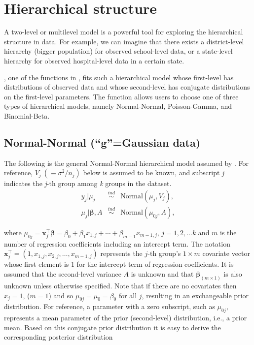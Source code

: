 \documentclass[article]{jss}
\begin{document}
\section[Hierarchical Structure]{Hierarchical structure} \label{sec2}
A two-level or multilevel model is a powerful tool for exploring the hierarchical structure in data. For example, we can imagine that there exists a district-level hierarchy (bigger population) for observed school-level data, or a state-level hierarchy for observed hospital-level data in a certain state. 

, one of the functions in , fits such a hierarchical model whose first-level has distributions of observed data and whose second-level has conjugate distributions on the first-level parameters. The  function allows users to choose one of three types of hierarchical models, namely Normal-Normal, Poisson-Gamma, and Binomial-Beta. 
 
\subsection[Normal-Normal]{Normal-Normal (``g''=Gaussian data)}
The following is the general Normal-Normal hierarchical model assumed by . For reference,  $V_{j}~(\equiv \sigma^{2}/n_{j})$ below is assumed to be known, and subscript \emph{j} indicates the \emph{j}-th group among \emph{k} groups in the dataset.
\begin{eqnarray}
y_{j}\vert \mu_{j} & \stackrel{ind}{\sim} &\textrm{Normal}(\mu_{j}, V_{j}),\label{normalobs}\\
\mu_{j}\vert \boldsymbol{\beta}, A & \stackrel{ind}{\sim} &\textrm{Normal}(\mu_{0j}, A),\label{normalprior}
\end{eqnarray}


where $\mu_{0j} = \boldsymbol{x}_j^\top \boldsymbol{\beta}=\beta_{0}+\beta_{1}x_{1, j} + \cdots + \beta_{m-1}x_{m-1, j}$, $j=1, 2, \ldots k$ and $m$ is the number of regression coefficients including an intercept term. The notation $\boldsymbol{x}_j^\top=(1, x_{1, j}, x_{2, j}, \ldots, x_{m-1, j})$ represents the $j$-th group's $1\times m$ covariate vector whose first element is 1 for the intercept term of regression coefficients. It is assumed that the second-level variance $A$ is unknown and that $\boldsymbol{\beta}_{(m\times1)}$ is also unknown unless otherwise specified. Note that if there are no covariates then $x_{j}=1$, ($m=1$) and so $\mu_{0j}=\mu_{0}=\beta_{0}$ for all $j$, resulting in an exchangeable prior distribution. For reference, a parameter with a zero subscript, such as $\mu_{0j}$, represents a mean parameter of the prior (second-level) distribution, i.e., a prior mean. Based on this conjugate prior distribution it is easy to derive the corresponding posterior distribution
\end{document}
